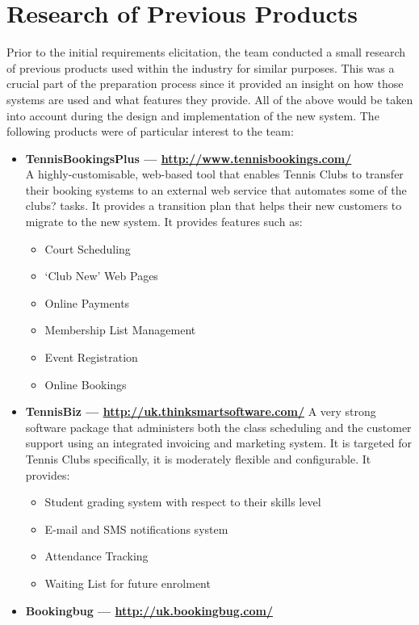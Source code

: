 \documentclass{l3proj}
\begin{document}
\section{Research of Previous Products}
\par
Prior to the initial requirements elicitation, the team conducted a small research of previous products used within the industry for similar purposes. This was a crucial part of the preparation process since it provided an insight on how those systems are used and what features they provide. All of the above would be taken into account during the design and implementation of the new system. The following products were of particular interest to the team:
\begin{itemize}
\item \textbf{TennisBookingsPlus --- \url{http://www.tennisbookings.com/}}\\
A highly-customisable, web-based tool that enables Tennis Clubs to transfer their booking systems to an external web service that automates some of the clubs? tasks. It provides a transition plan that helps their new customers to migrate to the new system. It provides features such as:
		\begin{itemize}
	\item Court Scheduling
	\item `Club New' Web Pages
	\item Online Payments
	\item Membership List Management
	\item Event Registration
	\item Online Bookings
		\end{itemize}
\item \textbf{TennisBiz --- \url{http://uk.thinksmartsoftware.com/}}
A very strong software package that administers both the class scheduling and the customer support using an integrated invoicing and marketing system. It is targeted for Tennis Clubs specifically, it is moderately flexible and configurable. It provides:
		\begin{itemize}
	\item Student grading system with respect to their skills level
	\item E-mail and SMS notifications system
	\item Attendance Tracking
	\item Waiting List for future enrolment
		\end{itemize}
\item \textbf{Bookingbug --- \url{http://uk.bookingbug.com/}}

\end{itemize}
\end{document}
